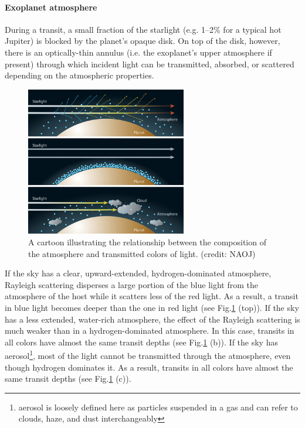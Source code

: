 
\paragraph{Exoplanet atmosphere}
During a transit, a small fraction of the starlight (e.g. 1–2\% for a typical hot Jupiter) %
is blocked by the planet's opaque disk. On top of the disk, however, there is an optically-thin annulus (i.e. the exoplanet's upper atmosphere if present) through which incident light can be transmitted, absorbed, or scattered depending on the atmospheric properties. %

\begin{figure}
\centering
\includegraphics[width=7cm]{figures/atmosphere.jpg}
\caption{A cartoon illustrating the relationship between the composition of the atmosphere and transmitted colors of light. (credit: NAOJ)}
\label{fig:atm}
\end{figure}

If the sky has a clear, upward-extended, hydrogen-dominated atmosphere, Rayleigh scattering disperses a large portion of the blue light from the atmosphere of the host while it scatters less of the red light. As a result, a transit in blue light becomes deeper than the one in red light (see Fig.\ref{fig:atm} (top)). If the sky has a less extended, water-rich atmosphere, the effect of the Rayleigh scattering is much weaker than in a hydrogen-dominated atmosphere. In this case, transits in all colors have almost the same transit depths (see Fig.\ref{fig:atm} (b)). If the sky has aerosol\footnote{aerosol is loosely defined here as particles suspended in a gas and can refer to clouds, haze, and dust interchangeably}, most of the light cannot be transmitted through the atmosphere, even though hydrogen dominates it. As a result, transits in all colors have almost the same transit depths (see Fig.\ref{fig:atm} (c)). 

